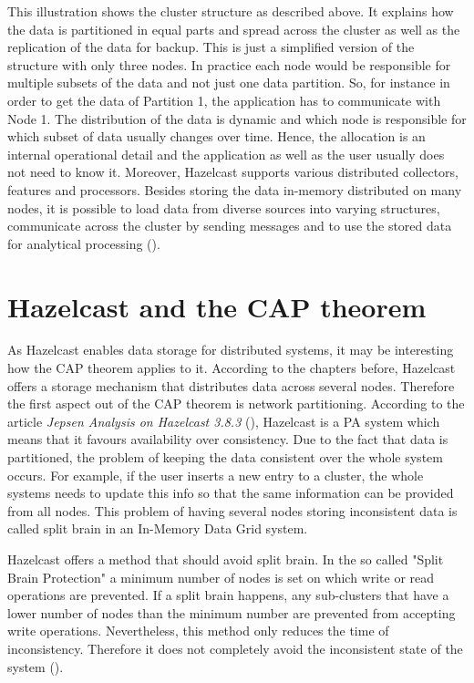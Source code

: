 This illustration shows the cluster structure as described above. It explains how the data is partitioned in equal parts and spread across the cluster as well as the replication of the data for backup. This is just a simplified version of the structure with only three nodes. In practice each node would be responsible for multiple subsets of the data and not just one data partition. So, for instance in order to get the data of Partition 1, the application has to communicate with Node 1. The distribution of the data is dynamic and which node is responsible for which subset of data usually changes over time. Hence, the allocation is an internal operational detail and the application as well as the user usually does not need to know it.
Moreover, Hazelcast supports various distributed collectors, features and processors. Besides storing the data in-memory distributed on many nodes, it is possible to load data from diverse sources into varying structures, communicate across the cluster by sending messages and to use the stored data for analytical processing (\cite{johns2015}).


\section{Hazelcast and the CAP theorem}
As Hazelcast enables data storage for distributed systems, it may be interesting how the CAP theorem applies to it. According to the chapters before, Hazelcast offers a storage mechanism that distributes data across several nodes. Therefore the first aspect out of the CAP theorem is network partitioning. According to the article \textit{Jepsen Analysis on Hazelcast 3.8.3} (\cite{hazelcastCP}), Hazelcast is a PA system which means that it favours availability over consistency. Due to the fact that data is partitioned, the problem of keeping the data consistent over the whole system occurs. For example, if the user inserts a new entry to a cluster, the whole systems needs to update this info so that the same information can be provided from all nodes. This problem of having several nodes storing inconsistent data is called split brain in an In-Memory Data Grid system.

Hazelcast offers a method that should avoid split brain. In the so called "Split Brain Protection" a minimum number of nodes is set on which write or read operations are prevented. If a split brain happens, any sub-clusters that have a lower number of nodes than the minimum number are prevented from accepting write operations. Nevertheless, this method only reduces the time of inconsistency. Therefore it does not completely avoid the inconsistent state of the system (\cite{hazelcastCP}).


